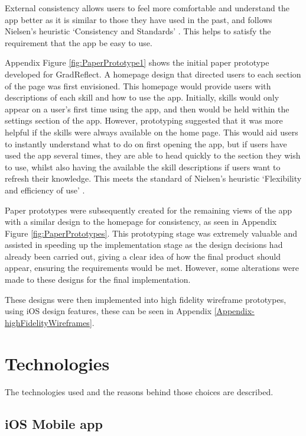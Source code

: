 \documentclass{l4proj}
\begin{document}
External consistency allows users to feel more comfortable and understand the app better as it is similar to those they have used in the past, and follows Nielsen’s heuristic ‘Consistency and Standards’ \citep{schlatter_visual_2013, Nielsen10}. This helps to satisfy the requirement that the app be easy to use. 

Appendix Figure \ref{fig:PaperPrototype1} shows the initial paper prototype developed for GradReflect. A homepage design that directed users to each section of the page was first envisioned. This homepage would provide users with descriptions of each skill and how to use the app. Initially, skills would only appear on a user’s first time using the app, and then would be held within the settings section of the app. However, prototyping suggested that it was more helpful if the skills were always available on the home page. This would aid users to instantly understand what to do on first opening the app, but if users have used the app several times, they are able to head quickly to the section they wish to use, whilst also having the available the skill descriptions if users want to refresh their knowledge. This meets the standard of Nielsen’s heuristic ‘Flexibility and efficiency of use’ \citep{Nielsen10}.

Paper prototypes were subsequently created for the remaining views of the app with a similar design to the homepage for consistency, as seen in Appendix Figure \ref{fig:PaperPrototypes}. This prototyping stage was extremely valuable and assisted in speeding up the implementation stage as the design decisions had already been carried out, giving a clear idea of how the final product should appear, ensuring the requirements would be met. However, some alterations were made to these designs for the final implementation. 

These designs were then implemented into high fidelity wireframe prototypes, using iOS design features, these can be seen in Appendix \ref{Appendix-highFidelityWireframes}.


\section{Technologies}

The technologies used and the reasons behind those choices are described.

\subsection{iOS Mobile app}
\end{document}
